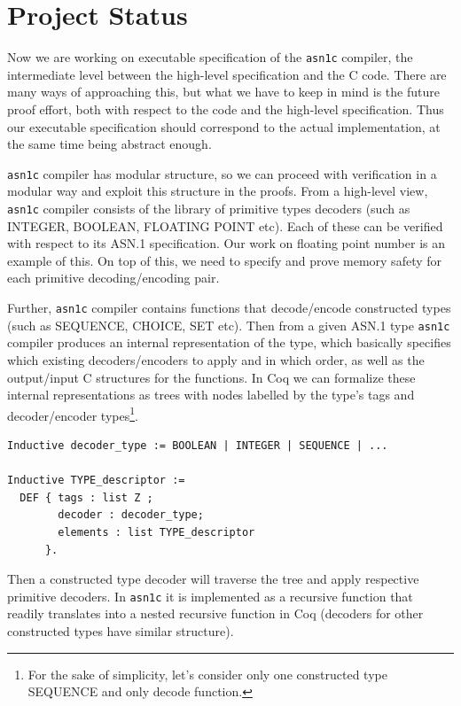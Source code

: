 \documentclass[acmsmall,nonacm]{acmart}
\begin{document}
\section{Project Status}

Now we are working on executable specification of the \texttt{asn1c} compiler, the intermediate level between the high-level specification and the C code. There are many ways of approaching this, but what we have to keep in mind is the future proof effort, both with respect to the code and the high-level specification. Thus our executable specification should correspond to the actual implementation, at the same time being abstract enough.

 \texttt{asn1c} compiler has modular structure, so we can proceed with verification in a modular way and exploit this structure in the proofs. From a high-level view, \texttt{asn1c} compiler consists of the library of primitive types decoders (such as INTEGER, BOOLEAN, FLOATING POINT etc). Each of these can be verified with respect to its ASN.1 specification. Our work on floating point number is an example of this. On top of this, we need to specify and prove memory safety for each primitive decoding/encoding pair.

 Further, \texttt{asn1c} compiler contains functions that decode/encode constructed types (such as SEQUENCE, CHOICE, SET etc). Then from a given ASN.1 type \texttt{asn1c} compiler produces an internal representation of the type, which basically specifies which existing decoders/encoders to apply and in which order, as well as the output/input C structures for the functions. In Coq we can formalize these internal representations as trees with nodes labelled by the type's tags and decoder/encoder types\footnote{For the sake of simplicity, let's consider only one constructed type SEQUENCE and only decode function.}.

 \begin{lstlisting}[language=Coq]
Inductive decoder_type := BOOLEAN | INTEGER | SEQUENCE | ...

Inductive TYPE_descriptor :=
  DEF { tags : list Z ;
        decoder : decoder_type;
        elements : list TYPE_descriptor 
      }.
 \end{lstlisting}

Then a constructed type decoder will traverse the tree and apply respective primitive decoders. In \texttt{asn1c} it is implemented as a recursive function that readily translates into a nested recursive function in Coq (decoders for other constructed types have similar structure).
 
\end{document}

